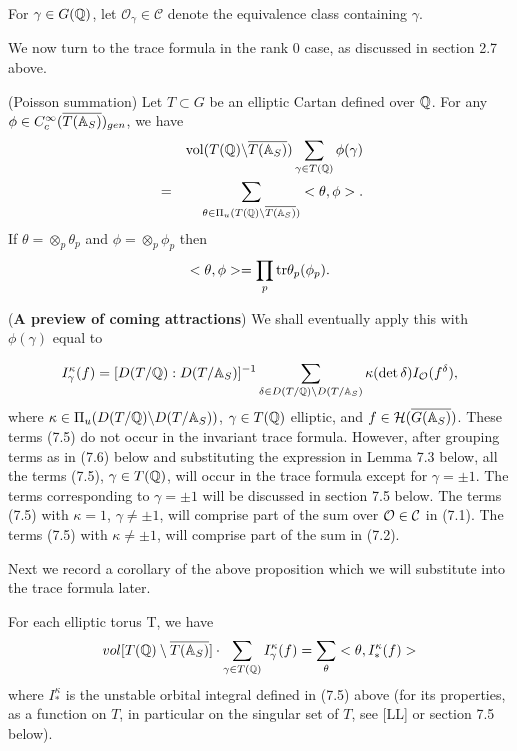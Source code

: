 For $\gamma \in G(\mathbb{Q} )$, let
${\mathcal{O}}_\gamma \in {\mathcal{C}}$ denote
the equivalence class containing $\gamma $. 

We now turn to the trace formula in the rank $0$ case, as discussed in
section 2.7 above.

\begin{proposition} (Poisson summation)
Let $T\subset G$ be an elliptic Cartan defined over $\mathbb{Q} $. For any
$\phi \in C_c^\infty (\overline{T(\mathbb{A} _S)})_{gen}$, we have 
\begin{eqnarray*}
&&{\mathrm{vol}}(T(\mathbb{Q} )\backslash \overline{T(\mathbb{A} _S)})
\sum_{\gamma \in T(\mathbb{Q} )}\phi (\gamma ) \\
&=&\sum_{\theta \in \Pi _u(T(\mathbb{Q} )\backslash \overline{T(\mathbb{A} _S)})}
<\theta,\phi>.
\end{eqnarray*}
If $\theta =\otimes _p\theta _p$ and $\phi=\otimes _p \phi_p$ then 
\[
<\theta ,\phi>=\prod_p{\rm tr}\theta _p(\phi_p).
\]
\end{proposition}

\begin{remark}
({\bf A preview of coming attractions})
We shall eventually apply this with $\phi (\gamma )$ equal to

\begin{equation}
I_\gamma ^\kappa (f)=
[D(T/\mathbb{Q} ): D(T/\mathbb{A} _S)]^{-1}
\sum_{\delta\in
D(T/\mathbb{Q} )\backslash D(T/\mathbb{A} _S)}
\kappa (\det \delta)I_{\cal{O}}(f^\delta),
\end{equation}
where $\kappa \in \Pi _u(D(T/\mathbb{Q} )\backslash D(T/\mathbb{A} _S))$,
$\gamma\in T(\mathbb{Q} )$ elliptic, and
$f\in {\cal H}(\overline{G(\mathbb{A} _S)})$.
These terms (7.5) do not occur in the invariant trace formula.
However, after grouping terms as in (7.6) below and substituting
the expression in Lemma 7.3 below, all the terms (7.5),
$\gamma\in T(\mathbb{Q} )$, will occur in the trace formula
except for $\gamma =\pm 1$. The terms corresponding to
$\gamma =\pm 1$ will be discussed in section 7.5 below.
The terms (7.5) with $\kappa = 1$, $\gamma\not= \pm 1$,
will comprise part of the sum over
${\cal{O}}\in {\cal{C}}$ in (7.1). The
terms (7.5) with $\kappa \not= \pm 1$,
will comprise part of the sum in (7.2).  
\end{remark}

Next we record a corollary of the above proposition 
which we will substitute into the trace formula later.

\begin{corollary}
For each elliptic torus T, we have 
\[
vol[T(\mathbb{Q} )\setminus \overline{T(\mathbb{A} _S)}]\cdot
\sum_{\gamma \in T({\Bbb Q})}
I_\gamma ^\kappa (f)=\sum_\theta <\theta ,I_{*}^\kappa (f)>
\]
where $I_{*}^\kappa $ is the unstable orbital integral defined in (7.5)
above (for its properties, as a function on $T$, in particular on the
singular set of $T$, see [LL] or section 7.5 below).
\end{corollary}


